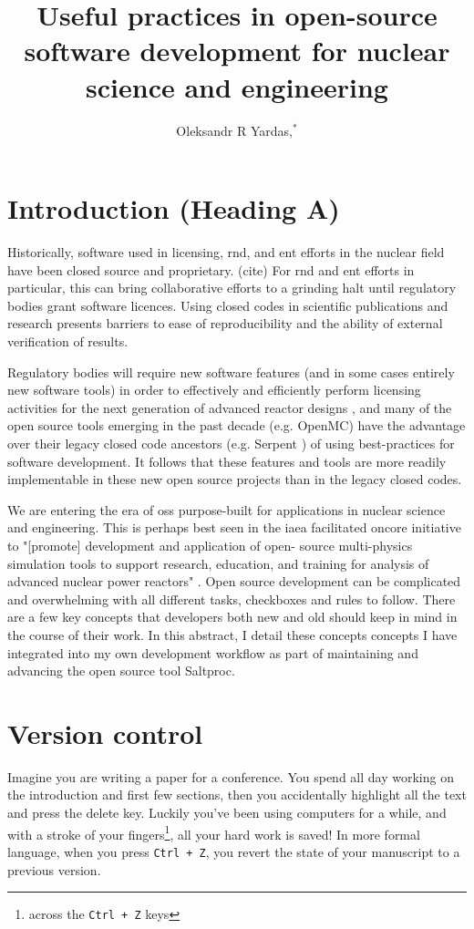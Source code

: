 \documentclass{anstrans}
\title{Useful practices in open-source software development for nuclear science and engineering}
\author{Oleksandr R Yardas,$^{*}$}
\institute{
$^{*}$Advanced Reactors and Fuel Cycles, University of Illinois - Urbana Champaign.
Champaign, IL, oyardas2@illinois.edu
}
\begin{document}
\section{Introduction (Heading A)}
    Historically, software used in licensing, \Gls{rnd}, and \Gls{ent} efforts in the nuclear field have been closed source and proprietary. (cite) For \Gls{rnd} and \Gls{ent} efforts in particular, this can bring collaborative efforts to a grinding halt until regulatory bodies grant software licences. Using closed codes in scientific publications and research presents barriers to ease of reproducibility and the ability of external verification of results.
    
    Regulatory bodies will require new software features (and in some cases entirely new software tools) in order to effectively and efficiently perform licensing activities for the next generation of advanced reactor designs \cite{usnrc_nonlwr_2020-1}, and many of the open source tools emerging in the past decade (e.g. OpenMC\cite{romano_openmc_2015}) have the advantage over their legacy closed code ancestors (e.g. Serpent \cite{leppanen_serpent_2014}) of using best-practices for software development. It follows that these features and tools are more readily implementable in these new open source projects than in the legacy closed codes.
    
    We are entering the era of \Gls{oss} purpose-built for applications in nuclear science and engineering. This is perhaps best seen in the \Gls{iaea} facilitated \Gls{oncore} initiative \cite{fiorina_initiative_2021} to "[promote] development and application of open- source multi-physics simulation tools to support research, education, and training for analysis of advanced nuclear power reactors"  \cite{iaea_open-source_2022}. Open source development can be complicated and overwhelming with all
    different tasks, checkboxes and rules to follow. There are a few key concepts that developers both new and old should keep in mind in the course of their work. In this abstract, I detail these concepts concepts I have integrated into my own development workflow as part of maintaining and advancing the open source tool Saltproc\cite{rykhlevskii_arfcsaltproc_2018}.

\section{Version control}
    Imagine you are writing a paper for a conference. You spend all day working on the introduction and first few sections, then you accidentally highlight all the text and press the delete key. Luckily you've been using computers for a while, and with a stroke of your fingers\footnote{across the \verb.Ctrl + Z. keys}, all your hard work is saved! In more formal language, when you press \verb.Ctrl + Z., you revert the state of your manuscript to a previous version.
    
\end{document}
